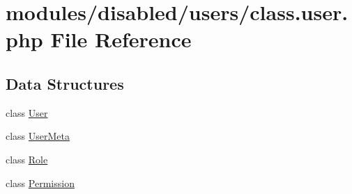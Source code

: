 \hypertarget{class_8user_8php}{\section{modules/disabled/users/class.user.\-php File Reference}
\label{class_8user_8php}
}
\subsection*{Data Structures}
\begin{DoxyCompactItemize}
\item 
class \hyperlink{class_user}{User}
\item 
class \hyperlink{class_user_meta}{User\-Meta}
\item 
class \hyperlink{class_role}{Role}
\item 
class \hyperlink{class_permission}{Permission}
\end{DoxyCompactItemize}
